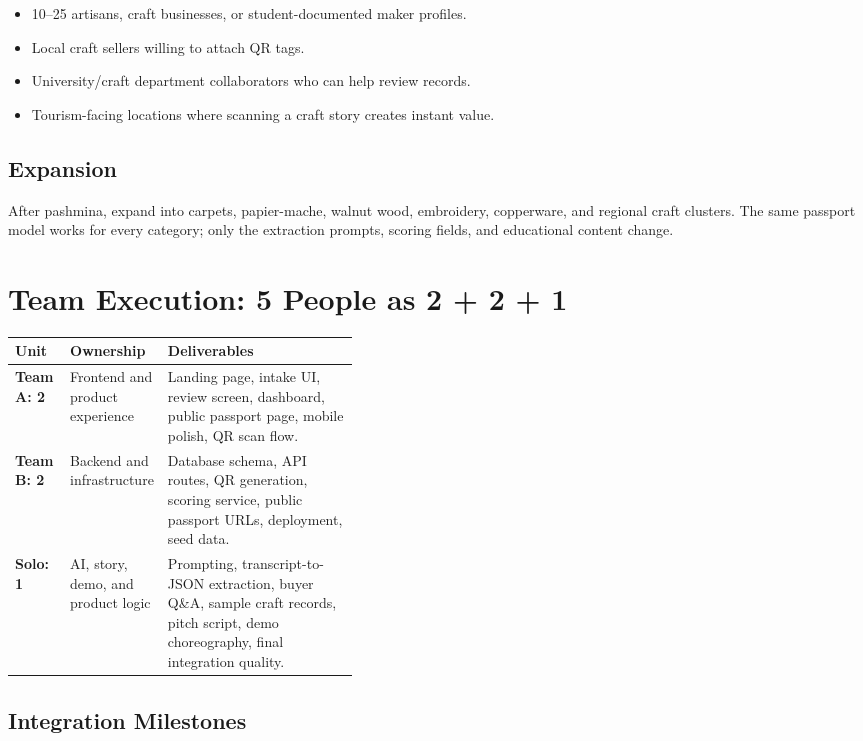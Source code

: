 \documentclass[11pt,a4paper]{article}
\begin{document}
\begin{itemize}
  \item 10--25 artisans, craft businesses, or student-documented maker profiles.
  \item Local craft sellers willing to attach QR tags.
  \item University/craft department collaborators who can help review records.
  \item Tourism-facing locations where scanning a craft story creates instant value.
\end{itemize}

\subsection{Expansion}

After pashmina, expand into carpets, papier-mache, walnut wood, embroidery, copperware, and regional craft clusters. The same passport model works for every category; only the extraction prompts, scoring fields, and educational content change.

\section{Team Execution: 5 People as 2 + 2 + 1}

\begin{center}
\begin{tabularx}{\linewidth}{>{\bfseries}p{0.16\linewidth}p{0.24\linewidth}X}
\toprule
Unit & Ownership & Deliverables \\
\midrule
Team A: 2 & Frontend and product experience & Landing page, intake UI, review screen, dashboard, public passport page, mobile polish, QR scan flow. \\
Team B: 2 & Backend and infrastructure & Database schema, API routes, QR generation, scoring service, public passport URLs, deployment, seed data. \\
Solo: 1 & AI, story, demo, and product logic & Prompting, transcript-to-JSON extraction, buyer Q\&A, sample craft records, pitch script, demo choreography, final integration quality. \\
\bottomrule
\end{tabularx}
\end{center}

\subsection{Integration Milestones}
\end{document}
